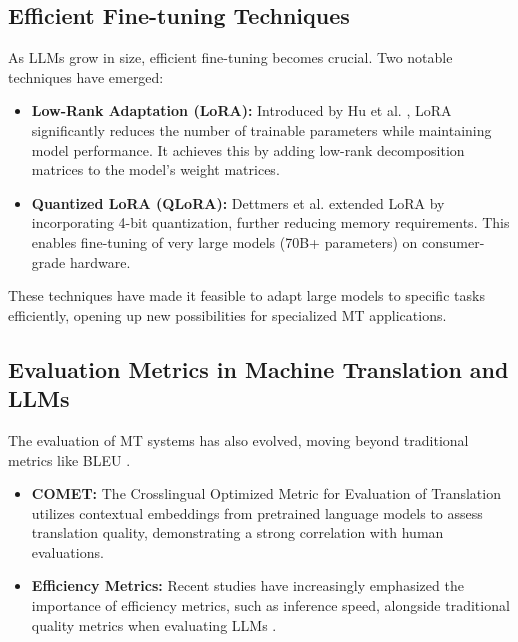 \documentclass[conference]{IEEEtran}
\begin{document}
\subsection{Efficient Fine-tuning Techniques}

As LLMs grow in size, efficient fine-tuning becomes crucial. Two notable techniques have emerged:

\begin{itemize}
    \item \textbf{Low-Rank Adaptation (LoRA):} Introduced by Hu et al. \cite{hu2021lora}, LoRA significantly reduces the number of trainable parameters while maintaining model performance. It achieves this by adding low-rank decomposition matrices to the model's weight matrices.
    
    \item \textbf{Quantized LoRA (QLoRA):} Dettmers et al. \cite{dettmers2023qlora} extended LoRA by incorporating 4-bit quantization, further reducing memory requirements. This enables fine-tuning of very large models (70B+ parameters) on consumer-grade hardware.
\end{itemize}

These techniques have made it feasible to adapt large models to specific tasks efficiently, opening up new possibilities for specialized MT applications.

\subsection{Evaluation Metrics in Machine Translation and LLMs}

The evaluation of MT systems has also evolved, moving beyond traditional metrics like BLEU \cite{papineni2002bleu}. 

\begin{itemize}
    \item \textbf{COMET:} The Crosslingual Optimized Metric for Evaluation of Translation \cite{rei2022comet} utilizes contextual embeddings from pretrained language models to assess translation quality, demonstrating a strong correlation with human evaluations.
    
    \item \textbf{Efficiency Metrics:} Recent studies have increasingly emphasized the importance of efficiency metrics, such as inference speed, alongside traditional quality metrics when evaluating LLMs \cite{huang2024performance, huang2024automating}.
\end{itemize}
\end{document}
